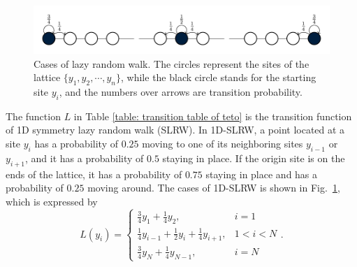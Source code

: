 \documentclass{article}
\begin{document}
\begin{figure}
    \centering
    \includegraphics[width=0.95\linewidth]{figures/appendix/lazzy_symmetry_random_walk.pdf}
    \caption{Cases of lazy random walk. The circles represent the sites of the lattice $\{y_1, y_2, \cdots, y_n\}$, while the black circle stands for the starting site $y_i$, and the numbers over arrows are transition probability.}
    \label{fig: lazy random walk}
\end{figure}

The function $L$ in Table \ref{table: transition table of teto} is the transition function of 1D symmetry lazy random walk (SLRW). 
In 1D-SLRW, a point located at a site $y_i$ has a probability of $0.25$  moving to one of its neighboring sites $y_{i-1}$ or $y_{i+1}$, and it has a probability of $0.5$ staying in place. If the origin site is on the ends of the lattice, it has a probability of $0.75$ staying in place and has a probability of $0.25$ moving around. The cases of 1D-SLRW is shown in Fig.~\ref{fig: lazy random walk}, which is expressed by 
\begin{equation}
\label{eq: lazy random walk L}
L\left(y_i\right)=
\begin{cases}
\frac{3}{4} y_1+\frac{1}{4} y_2, &i=1 \\
\frac{1}{4} y_{i-1}+\frac{1}{2} y_i+\frac{1}{4} y_{i+1}, &1<i<N \\
\frac{3}{4} y_N+\frac{1}{4} y_{N-1}, &i=N
\end{cases}.
\end{equation}
\end{document}
